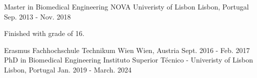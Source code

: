 

\begin{cventries}

  \cventry
    {Master in Biomedical Engineering} %
    {NOVA Univeristy of Lisbon} %
    {Lisbon, Portugal} %
    {Sep. 2013 - Nov. 2018} %
    {
      \begin{cvitems} %
        \item {Finished with grade of 16.}
      \end{cvitems}
    }
  \cventry
    {Erasmus} %
    {Fachhochschule Technikum Wien} %
    {Wien, Austria} %
    {Sept. 2016 - Feb. 2017} %
    {}
  \cventry
    {PhD in Biomedical Engineering} %
    {Instituto Superior Técnico - Univeristy of Lisbon} %
    {Lisbon, Portugal} %
    {Jan. 2019 - March. 2024} %
    {
    }
\end{cventries}
